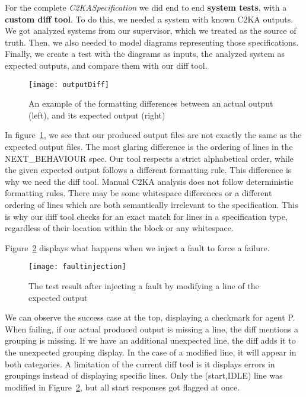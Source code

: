 For the complete \textit{C2KASpecification} we did end to end \textbf{system tests}, with a \textbf{custom diff tool}.
To do this, we needed a system with known C2KA outputs.
We got analyzed systems from our supervisor, which we treated as the source of truth.
Then, we also needed to model diagrams representing those specifications.
Finally, we create a test with the diagrams as inputs, the analyzed system as expected outputs,
and compare them with our diff tool.

\begin{figure}
    \centering
    \texttt{[image: outputDiff]}
    \caption{An example of the formatting differences between an actual output (left), and its expected output (right)}
    \label{fig:out-diff}
\end{figure}
In figure~\ref{fig:out-diff}, we see that our produced output files are not exactly the same as the expected output files.
The most glaring difference is the ordering of lines in the NEXT\_BEHAVIOUR spec.
Our tool respects a strict alphabetical order, while the given expected output follows a different formatting rule.
This difference is why we need the diff tool.
Manual C2KA analysis does not follow deterministic formatting rules.
There may be some whitespace differences or a different ordering of lines
which are both semantically irrelevant to the specification.
This is why our diff tool checks for an exact match for lines in a specification type,
regardless of their location within the block or any whitespace.

Figure~\ref{fig:faultinjection} displays what happens when we inject a fault to force a failure.
\begin{figure}
    \centering
    \texttt{[image: faultinjection]}
    \caption{The test result after injecting a fault by modifying a line of the expected output}
    \label{fig:faultinjection}
\end{figure}

We can observe the success case at the top, displaying a checkmark for agent P\@.
When failing, if our actual produced output is missing a line, the diff mentions a grouping is missing.
If we have an additional unexpected line, the diff adds it to the unexpected grouping display.
In the case of a modified line, it will appear in both categories.
A limitation of the current diff tool is it displays errors in groupings instead of displaying specific lines.
Only the (start,IDLE) line was modified in Figure~\ref{fig:faultinjection}, but all start responses got flagged at once.

